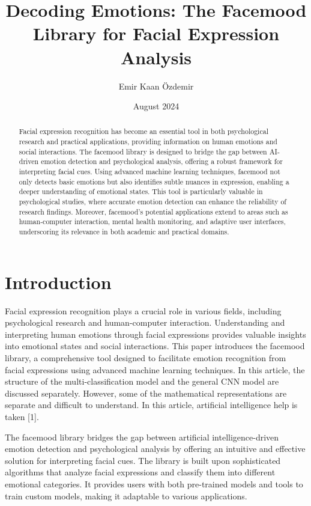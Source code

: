 \documentclass{article}
\title{Decoding Emotions: The Facemood Library for Facial Expression Analysis}
\author{Emir Kaan Özdemir}
\date{August 2024}
\begin{document}
\maketitle

\begin{abstract}
Facial expression recognition has become an essential tool in both psychological research and practical applications, providing information on human emotions and social interactions. The facemood library is designed to bridge the gap between AI-driven emotion detection and psychological analysis, offering a robust framework for interpreting facial cues. Using advanced machine learning techniques, facemood not only detects basic emotions but also identifies subtle nuances in expression, enabling a deeper understanding of emotional states. This tool is particularly valuable in psychological studies, where accurate emotion detection can enhance the reliability of research findings. Moreover, facemood's potential applications extend to areas such as human-computer interaction, mental health monitoring, and adaptive user interfaces, underscoring its relevance in both academic and practical domains. 
\end{abstract}

\vspace{7cm}

\tableofcontents

\vspace{4cm}

\section{Introduction}
Facial expression recognition plays a crucial role in various fields, including psychological research and human-computer interaction. Understanding and interpreting human emotions through facial expressions provides valuable insights into emotional states and social interactions. This paper introduces the facemood library, a comprehensive tool designed to facilitate emotion recognition from facial expressions using advanced machine learning techniques. In this article, the structure of the multi-classification model and the general CNN model are discussed separately. However, some of the mathematical representations are separate and difficult to understand. In this article, artificial intelligence help is taken [1].

\vspace{0.5cm}

The facemood library bridges the gap between artificial intelligence-driven emotion detection and psychological analysis by offering an intuitive and effective solution for interpreting facial cues. The library is built upon sophisticated algorithms that analyze facial expressions and classify them into different emotional categories. It provides users with both pre-trained models and tools to train custom models, making it adaptable to various applications.
\end{document}
